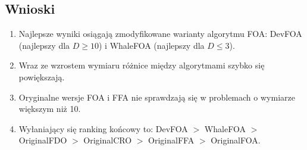 \documentclass[12pt,a4paper]{article}
\begin{document}
\subsection{Wnioski}

\begin{enumerate}
    \item Najlepsze wyniki osiągają zmodyfikowane warianty algorytmu FOA: DevFOA (najlepszy
    dla $D\geq10$) i WhaleFOA (najlepszy dla $D\leq3$).
    \item Wraz ze wzrostem wymiaru różnice między algorytmami szybko się powiększają.
    \item Oryginalne wersje FOA i FFA nie sprawdzają się w problemach o wymiarze większym niż 10.
    \item Wyłaniający się ranking końcowy to: DevFOA $>$ WhaleFOA $>$ OriginalFDO $>$ OriginalCRO $>$
    OriginalFFA $>$ OriginalFOA.
\end{enumerate}

\printbibliography[title={Literatura}]
\end{document}
